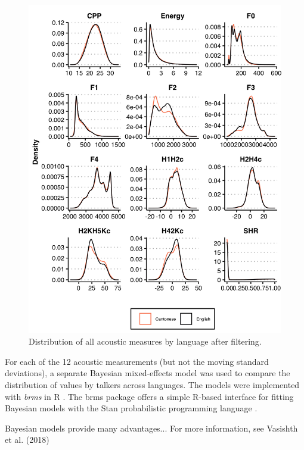 \begin{figure}[htbp]
    \begin{center}
    \includegraphics[width=\linewidth]{figures/ch3_allmeasuresdensity_5in.png} 
    \caption{Distribution of all acoustic measures by language after filtering.}
    \label{ch3:fig:allmeasures}
    \end{center}
    \end{figure}

    For each of the 12 acoustic measurements (but not the moving standard deviations), a separate Bayesian mixed-effects model was used to compare the distribution of values by talkers across languages.  The models were implemented with \textit{brms} \citep{} in R \citep{}. The brms package offers a simple R-based interface for fitting Bayesian models with the Stan probabilistic programming language \citep{}. 

    Bayesian models provide many advantages... For more information, see Vasishth et al. (2018)
    
